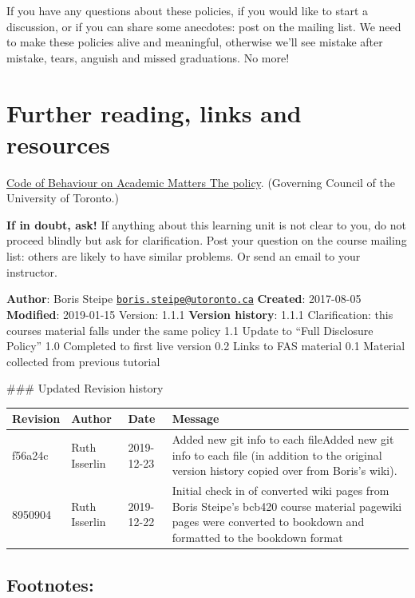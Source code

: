 \documentclass[]{book}
\let\BeginKnitrBlock\begin \let\EndKnitrBlock\end
\begin{document}
If you have any questions about these policies, if you would like to
start a discussion, or if you can share some anecdotes: post on the
mailing list. We need to make these policies alive and meaningful,
otherwise we'll see mistake after mistake, tears, anguish and missed
graduations. No more!

\section{Further reading, links and
resources}\label{further-reading-links-and-resources-3}

\href{https://governingcouncil.utoronto.ca/secretariat/policies/code-behaviour-academic-matters-july-1-2019}{Code
of Behaviour on Academic Matters The policy}. (Governing Council of the
University of Toronto.)

\textbf{If in doubt, ask!} If anything about this learning unit is not
clear to you, do not proceed blindly but ask for clarification. Post
your question on the course mailing list: others are likely to have
similar problems. Or send an email to your instructor.

\BeginKnitrBlock{rmd-original-history}
\textbf{Author}: Boris Steipe
\href{mailto:boris.steipe@utoronto.ca}{\nolinkurl{boris.steipe@utoronto.ca}}
\textbf{Created}: 2017-08-05 \textbf{Modified}: 2019-01-15 Version:
1.1.1 \textbf{Version history}: 1.1.1 Clarification: this courses
material falls under the same policy 1.1 Update to ``Full Disclosure
Policy'' 1.0 Completed to first live version 0.2 Links to FAS material
0.1 Material collected from previous tutorial
\EndKnitrBlock{rmd-original-history} \#\#\# Updated Revision history

\begin{tabular}{l|l|l|l}
\hline
Revision & Author & Date & Message\\
\hline
f56a24c & Ruth Isserlin & 2019-12-23 & Added new git info to each fileAdded new git info to each file (in addition to the original version history copied over from Boris's wiki).\\
\hline
8950904 & Ruth Isserlin & 2019-12-22 & Initial check in of converted wiki pages from Boris Steipe's bcb420 course material pagewiki pages were converted to bookdown and formatted to the bookdown format\\
\hline
\end{tabular}

\subsection{Footnotes:}\label{footnotes-1}
\end{document}
